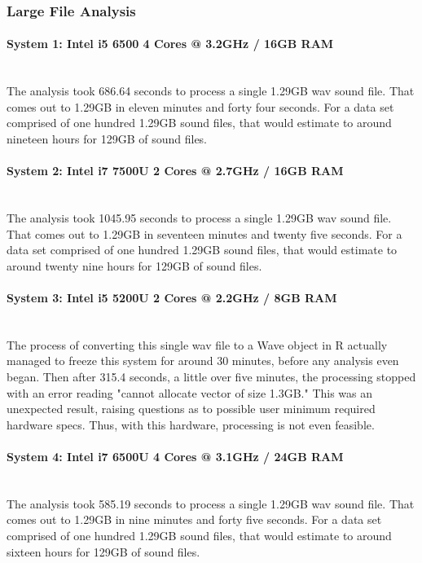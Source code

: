 \subsubsection{Large File Analysis}

\paragraph{System 1: Intel i5 6500 4 Cores @ 3.2GHz / 16GB RAM} \mbox{}\\[\paragraphheaderspace]
The analysis took 686.64 seconds to process a single 1.29GB wav sound file. That comes out to 1.29GB in eleven minutes and forty four seconds. For a data set comprised of one hundred 1.29GB sound files, that would estimate to around nineteen hours for 129GB of sound files.

\paragraph{System 2: Intel i7 7500U 2 Cores @ 2.7GHz / 16GB RAM} \mbox{}\\[\paragraphheaderspace]
The analysis took 1045.95 seconds to process a single 1.29GB wav sound file. That comes out to 1.29GB in seventeen minutes and twenty five seconds. For a data set comprised of one hundred 1.29GB sound files, that would estimate to around twenty nine hours for 129GB of sound files.

\paragraph{System 3: Intel i5 5200U 2 Cores @ 2.2GHz / 8GB RAM} \mbox{}\\[\paragraphheaderspace]
The process of converting this single wav file to a Wave object in R actually managed to freeze this system for around 30 minutes, before any analysis even began. Then after 315.4 seconds, a little over five minutes, the processing stopped with an error reading "cannot allocate vector of size 1.3GB." This was an unexpected result, raising questions as to possible user minimum required hardware specs. Thus, with this hardware, processing is not even feasible.

\paragraph{System 4: Intel i7 6500U 4 Cores @ 3.1GHz / 24GB RAM} \mbox{}\\[\paragraphheaderspace]
The analysis took 585.19 seconds to process a single 1.29GB wav sound file. That comes out to 1.29GB in nine minutes and forty five seconds. For a data set comprised of one hundred 1.29GB sound files, that would estimate to around sixteen hours for 129GB of sound files.

